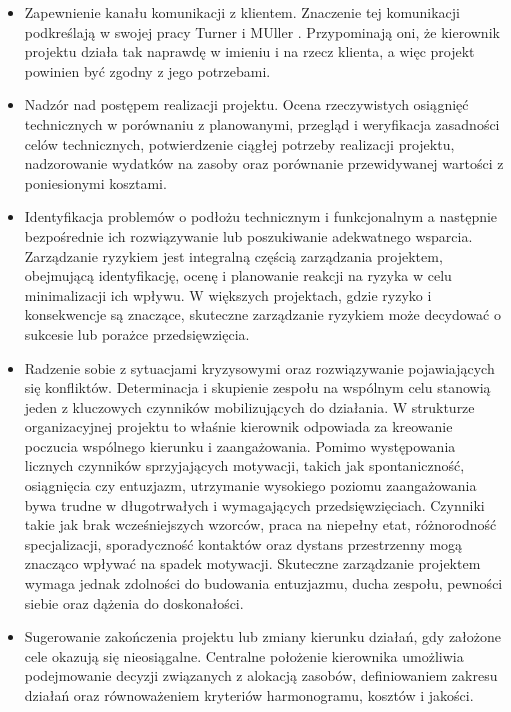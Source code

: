 \begin{itemize}
    \item Zapewnienie kanału komunikacji z klientem. Znaczenie tej komunikacji podkreślają w swojej pracy Turner i MUller \autocite{turnermuller}. Przypominają oni, że kierownik projektu działa tak naprawdę w imieniu i na rzecz klienta, a więc projekt powinien być zgodny z jego potrzebami.
    \item Nadzór nad postępem realizacji projektu. Ocena rzeczywistych osiągnięć technicznych w porównaniu z planowanymi, przegląd i weryfikacja zasadności celów technicznych, potwierdzenie ciągłej potrzeby realizacji projektu, nadzorowanie wydatków na zasoby oraz porównanie przewidywanej wartości z poniesionymi kosztami. \autocite{Roman}\autocite{vaupel}
    \item Identyfikacja problemów o podłożu technicznym i funkcjonalnym a następnie bezpośrednie ich rozwiązywanie lub poszukiwanie adekwatnego wsparcia. Zarządzanie ryzykiem jest integralną częścią zarządzania projektem, obejmującą identyfikację, ocenę i planowanie reakcji na ryzyka w celu minimalizacji ich wpływu. W większych projektach, gdzie ryzyko i konsekwencje są znaczące, skuteczne zarządzanie ryzykiem może decydować o sukcesie lub porażce przedsięwzięcia.
    \item Radzenie sobie z sytuacjami kryzysowymi oraz rozwiązywanie pojawiających się konfliktów. Determinacja i skupienie zespołu na wspólnym celu stanowią jeden z kluczowych czynników mobilizujących do działania. W strukturze organizacyjnej projektu to właśnie kierownik odpowiada za kreowanie poczucia wspólnego kierunku i zaangażowania. Pomimo występowania licznych czynników sprzyjających motywacji, takich jak spontaniczność, osiągnięcia czy entuzjazm, utrzymanie wysokiego poziomu zaangażowania bywa trudne w długotrwałych i wymagających przedsięwzięciach. Czynniki takie jak brak wcześniejszych wzorców, praca na niepełny etat, różnorodność specjalizacji, sporadyczność kontaktów oraz dystans przestrzenny mogą znacząco wpływać na spadek motywacji. Skuteczne zarządzanie projektem wymaga jednak zdolności do budowania entuzjazmu, ducha zespołu, pewności siebie oraz dążenia do doskonałości.
    \item Sugerowanie zakończenia projektu lub zmiany kierunku działań, gdy założone cele okazują się nieosiągalne. Centralne położenie kierownika umożliwia podejmowanie decyzji związanych z alokacją zasobów, definiowaniem zakresu działań oraz równoważeniem kryteriów harmonogramu, kosztów i jakości. \autocite{NicholasSteyn}
\end{itemize}


